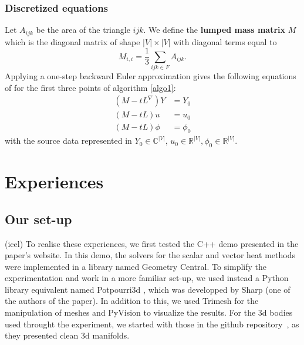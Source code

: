 \documentclass[sigconf]{acmart}
\begin{document}
\subsubsection{Discretized equations}
Let $A_{ijk}$ be the area of the triangle $ijk$. We define the \textbf{lumped mass matrix} $M$ which is the diagonal matrix of shape $|V| \times |V|$ with diagonal terms 
equal to $$M_{i,i} = \frac{1}{3}\sum_{ijk\in F}A_{ijk}.$$ Applying a one-step backward Euler approximation gives the following equations of for the first three points 
of algorithm \ref{algo1}:
\begin{align*}
 (M-tL^\nabla)Y & = Y_0 \\
 (M - tL)u & = u_0 \\
 (M - tL)\phi & = \phi_0
\end{align*}
with the source data represented in $Y_0\in \mathbb{C}^{|V|}$, $u_0 \in \mathbb{R}^|V|, \phi_0 \in \mathbb{R}^{|V|}$.

\section{Experiences}

\subsection{Our set-up}
(icel)
To realise these experiences, we first tested the C++ demo presented in the paper's website.
In this demo, the solvers for the scalar and vector heat methods were implemented in a library named Geometry Central.
To simplify the experimentation and work in a more familiar set-up, we used instead a Python library equivalent named Potpourri3d \cite{library_potpourri3d}, 
which was developped by Sharp (one of the authors of the paper).
In addition to this, we used Trimesh for the manipulation of meshes and PyVision to visualize the results.
For the 3d bodies used throught the experiment, we started with those in the github repository~\cite{github_objects_repo},
as they presented clean 3d manifolds.
\end{document}
